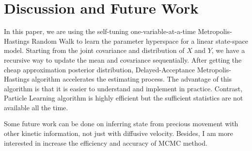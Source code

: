 \section{Discussion and Future Work}

In this paper, we are using the self-tuning one-variable-at-a-time Metropolis-Hastings Random Walk to learn the parameter hyperspace for a linear state-space model.  Starting from the joint covariance and distribution of $X$ and $Y$, we have a recursive way to update the mean and covariance sequentially. After getting the cheap approximation posterior distribution, Delayed-Acceptance Metropolis-Hastings algorithm accelerates the estimating process.  The advantage of this algorithm is that it is easier to understand and implement in practice. Contrast, Particle Learning algorithm is highly efficient but the sufficient statistics are not available all the time. 

Some future work can be done on inferring state from precious movement with other kinetic information, not just with diffusive velocity. Besides, I am more interested in increase the efficiency and accuracy of MCMC method. 

